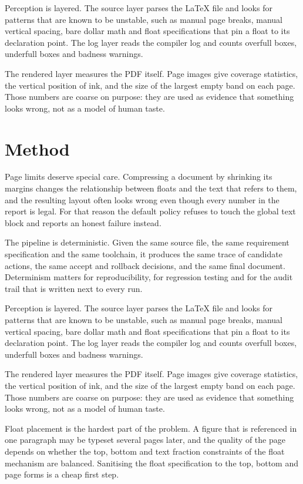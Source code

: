 \documentclass[10pt,a4paper]{article}
\begin{document}
Perception is layered. The source layer parses the LaTeX file and looks for patterns that are known to be unstable, such as manual page breaks, manual vertical spacing, bare dollar math and float specifications that pin a float to its declaration point. The log layer reads the compiler log and counts overfull boxes, underfull boxes and badness warnings.

The rendered layer measures the PDF itself. Page images give coverage statistics, the vertical position of ink, and the size of the largest empty band on each page. Those numbers are coarse on purpose: they are used as evidence that something looks wrong, not as a model of human taste.


\section{Method}
Page limits deserve special care. Compressing a document by shrinking its margins changes the relationship between floats and the text that refers to them, and the resulting layout often looks wrong even though every number in the report is legal. For that reason the default policy refuses to touch the global text block and reports an honest failure instead.

The pipeline is deterministic. Given the same source file, the same requirement specification and the same toolchain, it produces the same trace of candidate actions, the same accept and rollback decisions, and the same final document. Determinism matters for reproducibility, for regression testing and for the audit trail that is written next to every run.

Perception is layered. The source layer parses the LaTeX file and looks for patterns that are known to be unstable, such as manual page breaks, manual vertical spacing, bare dollar math and float specifications that pin a float to its declaration point. The log layer reads the compiler log and counts overfull boxes, underfull boxes and badness warnings.

The rendered layer measures the PDF itself. Page images give coverage statistics, the vertical position of ink, and the size of the largest empty band on each page. Those numbers are coarse on purpose: they are used as evidence that something looks wrong, not as a model of human taste.

Float placement is the hardest part of the problem. A figure that is referenced in one paragraph may be typeset several pages later, and the quality of the page depends on whether the top, bottom and text fraction constraints of the float mechanism are balanced. Sanitising the float specification to the top, bottom and page forms is a cheap first step.
\end{document}
